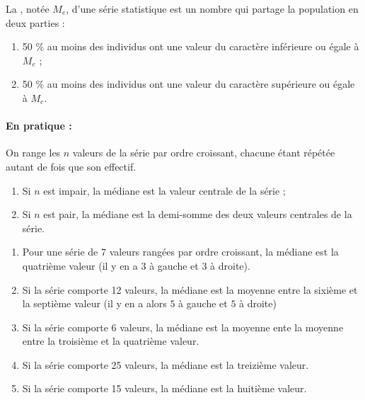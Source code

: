 \begin{definition}
    La , notée $M_e$, d'une série statistique est un
  nombre qui partage la population en deux parties :
  \begin{enumerate}
  \item 50 \% au moins des individus ont une valeur du caractère
    inférieure ou égale à $M_e$ ;
  \item 50 \% au moins des individus ont une valeur du caractère
    supérieure ou égale à $M_e$.
  \end{enumerate}  

    
\end{definition}


\paragraph{En pratique :}On range les $n$ valeurs de la série par ordre
  croissant, chacune étant répétée autant de fois que son effectif.


\begin{enumerate}
\item Si $n$ est impair, la médiane est la valeur centrale de la série ;
\item Si $n$ est pair, la médiane est la demi-somme des deux valeurs
  centrales de la série.
\end{enumerate}

\medskip

\begin{example}
\begin{enumerate}
\item Pour une série de 7 valeurs rangées par ordre
    croissant, la médiane est la quatrième valeur (il y en a \( 3\) à gauche et \( 3\) à droite).
\item Si la série comporte 12 valeurs, la médiane est la moyenne entre la sixième et la septième valeur (il y en a alors \( 5\) à gauche et \( 5\) à droite)
\item Si la série comporte 6 valeurs, la médiane est la moyenne ente la moyenne entre la troisième et la quatrième valeur. 
\item Si la série comporte 25 valeurs, la médiane est la treizième valeur.
\item Si la série comporte 15 valeurs, la médiane est la huitième valeur.
\end{enumerate}
    
\end{example}

